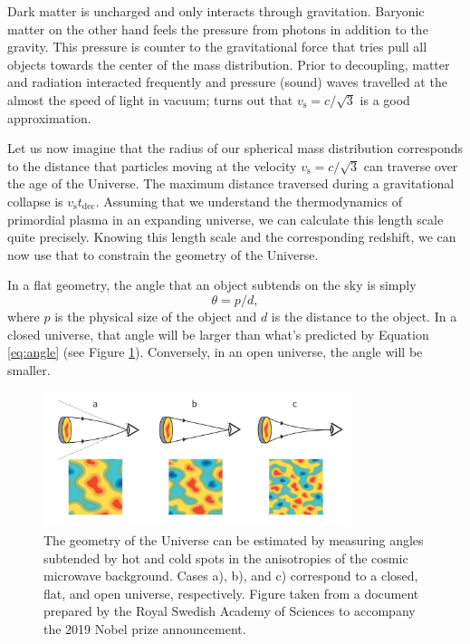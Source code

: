 \documentclass[a4paper,12pt]{article}
\theoremstyle{remark}
\newcommand{\mrm}[1]{\mathrm{#1}}
\renewcommand{\=}[1]{\stackrel{#1}{=}} %
\theoremstyle{plain}
\theoremstyle{definition}
\begin{document}
Dark matter is uncharged and only interacts through gravitation. Baryonic matter on the other hand feels the pressure from photons in addition to the gravity. This pressure is counter to the gravitational force that tries pull all objects towards the center of the mass distribution. Prior to decoupling, matter and radiation interacted frequently and pressure (sound) waves travelled at the almost the speed of light in vacuum; turns out that $v_\mrm{s} = c/\sqrt{3}$ is a good approximation. 

Let us now imagine that the radius of our spherical mass distribution corresponds to the distance that particles moving at the velocity $v_\mrm{s} = c/\sqrt{3}$ can traverse over the age of the Universe. The maximum distance traversed during a gravitational collapse is $v_\mrm{s} t_\mrm{dec}$. Assuming that we understand the thermodynamics of primordial plasma in an expanding universe, we can calculate this length scale quite precisely. Knowing this length scale and the corresponding redshift, we can now use that to constrain the geometry of the Universe. 

In a flat geometry, the angle that an object subtends on the sky is simply
\begin{equation}
\theta = p / d,
\label{eq:angle}
\end{equation}
where $p$ is the physical size of the object and $d$ is the distance to the object. In a closed universe, that angle will be larger than what's predicted by Equation \ref{eq:angle} (see Figure \ref{fig:geometry}). Conversely, in an open universe, the angle will be smaller.

\begin{figure}[t]
\begin{center}
    \includegraphics*[angle=0,width=0.8\textwidth]{img/geometry.png}
    \caption[Geometry of the Universe]{The geometry of the Universe can be estimated by measuring angles subtended by hot and cold spots in the anisotropies of the cosmic microwave background. Cases a), b), and c) correspond to a closed, flat, and open universe, respectively. Figure taken from a document prepared by the Royal Swedish Academy of Sciences to accompany the 2019 Nobel prize announcement.}
\label{fig:geometry}
\end{center}
\end{figure}
\end{document}
